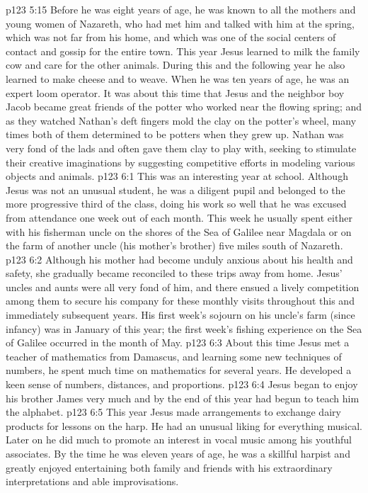 \pc \vs p123 5:15 Before he was eight years of age, he was known to all the mothers and young women of Nazareth, who had met him and talked with him at the spring, which was not far from his home, and which was one of the social centers of contact and gossip for the entire town. This year Jesus learned to milk the family cow and care for the other animals. During this and the following year he also learned to make cheese and to weave. When he was ten years of age, he was an expert loom operator. It was about this time that Jesus and the neighbor boy Jacob became great friends of the potter who worked near the flowing spring; and as they watched Nathan’s deft fingers mold the clay on the potter’s wheel, many times both of them determined to be potters when they grew up. Nathan was very fond of the lads and often gave them clay to play with, seeking to stimulate their creative imaginations by suggesting competitive efforts in modeling various objects and animals.\plusone
{}
\vs p123 6:1 This was an interesting year at school. Although Jesus was not an unusual student, he was a diligent pupil and belonged to the more progressive third of the class, doing his work so well that he was excused from attendance one week out of each month. This week he usually spent either with his fisherman uncle on the shores of the Sea of Galilee near Magdala or on the farm of another uncle (his mother’s brother) five miles south of Nazareth.
\vs p123 6:2 Although his mother had become unduly anxious about his health and safety, she gradually became reconciled to these trips away from home. Jesus’ uncles and aunts were all very fond of him, and there ensued a lively competition among them to secure his company for these monthly visits throughout this and immediately subsequent years. His first week’s sojourn on his uncle’s farm (since infancy) was in January of this year; the first week’s fishing experience on the Sea of Galilee occurred in the month of May.
\vs p123 6:3 About this time Jesus met a teacher of mathematics from Damascus, and learning some new techniques of numbers, he spent much time on mathematics for several years. He developed a keen sense of numbers, distances, and proportions.
\vs p123 6:4 Jesus began to enjoy his brother James very much and by the end of this year had begun to teach him the alphabet.
\vs p123 6:5 This year Jesus made arrangements to exchange dairy products for lessons on the harp. He had an unusual liking for everything musical. Later on he did much to promote an interest in vocal music among his youthful associates. By the time he was eleven years of age, he was a skillful harpist and greatly enjoyed entertaining both family and friends with his extraordinary interpretations and able improvisations.
